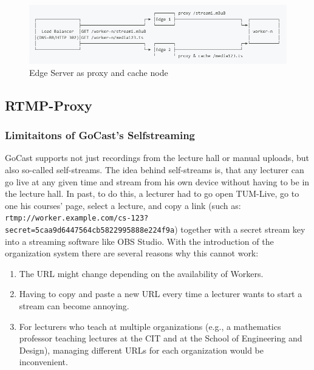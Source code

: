 \begin{figure}[htpb]
    \centering
    \includegraphics[width=\linewidth]{images/EdgeNetwork.png}
    \caption[Edge Server as proxy and cache node]{Edge Server as proxy and cache node}\label{fig:edge-network}
\end{figure}


\subsection{RTMP-Proxy}

\subsubsection{Limitaitons of GoCast's Selfstreaming}

GoCast supports not just recordings from the lecture hall or manual uploads, but also so-called self-streams. The idea behind self-streams is, that any lecturer can go live at any given time and stream from his own device without having to be in the lecture hall. In past, to do this, a lecturer had to go open TUM-Live, go to one his courses' page, select a lecture, and copy a link (such as: \texttt{rtmp://worker.example.com/cs-123? secret=5caa9d6447564cb5822995888e224f9a}) together with a secret stream key into a streaming software like OBS Studio. With the introduction of the organization system there are several reasons why this cannot work:

\begin{enumerate}
    \item The URL might change depending on the availability of Workers.
    \item Having to copy and paste a new URL every time a lecturer wants to start a stream can become annoying.
    \item For lecturers who teach at multiple organizations (e.g., a mathematics professor teaching lectures at the \ac{CIT} and at the School of Engineering and Design), managing different URLs for each organization would be inconvenient.
\end{enumerate}

